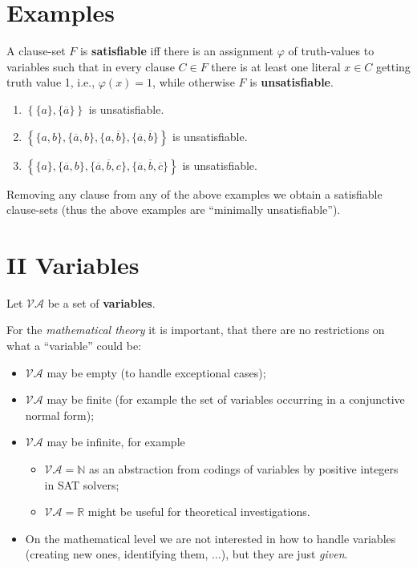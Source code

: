 \documentclass{article}
\def\mva{{\mathcal{VA}}}
\def\pmva{{\pmb{\mathcal{VA}}}}
\begin{document}
\section{Examples}%

A clause-set $F$ is \textbf{satisfiable} iff there is an assignment $\varphi$ of truth-values to variables such that in every clause $C \in F$ there is at least one literal $x \in C$ getting truth value 1, i.e., $\varphi(x) = 1$, while otherwise $F$ is \textbf{unsatisfiable}.
\begin{enumerate}
\item $\left\{\{a\}, \{\overline{a}\}\right\}$ is unsatisfiable.
\item $\left\{\{a,b\}, \{\overline{a},b\}, \{a, \overline{b}\}, \{\overline{a},\overline{b}\}\right\}$ is unsatisfiable.
\item $\left\{\{a\}, \{\overline{a},b\}, \{\overline{a}, \overline{b}, c\}, \{\overline{a}, \overline{b}, \overline{c}\}\right\}$ is unsatisfiable.
\end{enumerate}
Removing any clause from any of the above examples we obtain a satisfiable clause-sets (thus the above examples are ``minimally unsatisfiable'').


\section{II Variables}%

Let $\pmva$ be a set of  \textbf{variables}.

For the \textit{mathematical theory} it is important, that there are no restrictions on what a ``variable'' could be:
\begin{itemize}
\item $\mva$ may be empty (to handle exceptional cases);
\item $\mva$ may be finite (for example the set of variables occurring in a conjunctive normal form);
\item $\mva$ may be infinite, for example
\begin{itemize}
\item $\mva = \mathbb{N}$ as an abstraction from codings of variables by positive integers in SAT solvers;
\item $\mva = \mathbb{R}$ might be useful for theoretical investigations.
\end{itemize}
\item On the mathematical level we are not interested in how to handle variables (creating new ones, identifying them, $\ldots$), but they are just \textit{given}.
\end{itemize}
\end{document}
